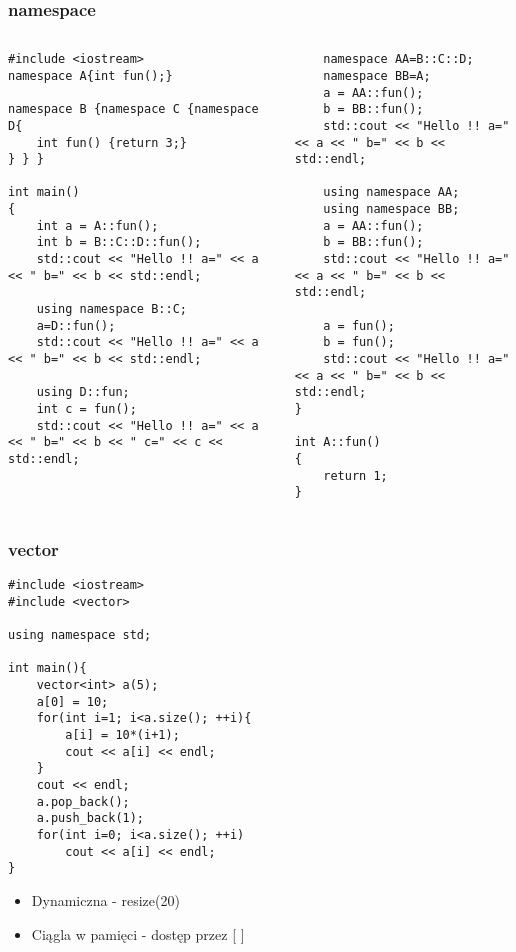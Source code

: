 \documentclass[10pt]{beamer}
\begin{document}
\begin{frame}[fragile]
  \frametitle{namespace}
  \begin{columns}
    \begin{column}{0.48\textwidth}
      \begin{lstlisting}
#include <iostream>
namespace A{int fun();}

namespace B {namespace C {namespace D{
    int fun() {return 3;}
} } }

int main()
{
    int a = A::fun();
    int b = B::C::D::fun();
    std::cout << "Hello !! a=" << a << " b=" << b << std::endl;

    using namespace B::C;
    a=D::fun();
    std::cout << "Hello !! a=" << a << " b=" << b << std::endl;

    using D::fun;
    int c = fun();
    std::cout << "Hello !! a=" << a << " b=" << b << " c=" << c << std::endl;
      \end{lstlisting}
    \end{column}
    \begin{column}{0.48\textwidth}
      \begin{lstlisting}
    namespace AA=B::C::D;
    namespace BB=A;
    a = AA::fun();
    b = BB::fun();
    std::cout << "Hello !! a=" << a << " b=" << b << std::endl;

    using namespace AA;
    using namespace BB;
    a = AA::fun();
    b = BB::fun();
    std::cout << "Hello !! a=" << a << " b=" << b << std::endl;

    a = fun();
    b = fun();
    std::cout << "Hello !! a=" << a << " b=" << b << std::endl;
}

int A::fun()
{
    return 1;
}
      \end{lstlisting}
    \end{column}
  \end{columns}
  \centering
  
\end{frame}

\begin{frame}[fragile]
  \frametitle{vector}
\begin{lstlisting}
#include <iostream>
#include <vector>

using namespace std;

int main(){
    vector<int> a(5);
    a[0] = 10;
    for(int i=1; i<a.size(); ++i){
        a[i] = 10*(i+1);
        cout << a[i] << endl;
    }
    cout << endl;
    a.pop_back();
    a.push_back(1);
    for(int i=0; i<a.size(); ++i)
        cout << a[i] << endl;
}
\end{lstlisting}

\begin{itemize}
  \item Dynamiczna - resize(20)
  \item Ciągla w pamięci - dostęp przez [ ]
\end{itemize}

\end{frame}
\end{document}
